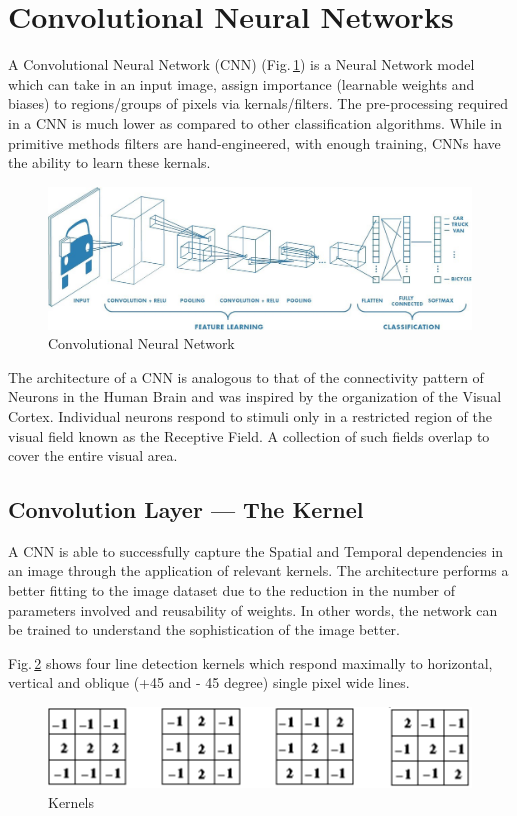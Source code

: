\section{Convolutional Neural Networks}
A Convolutional Neural Network (CNN) (Fig.\,\ref{cnn}) is a Neural Network model which can take in an input image, assign importance (learnable weights and biases) to regions/groups of pixels via kernals/filters. The pre-processing required in a CNN is much lower as compared to other classification algorithms. While in primitive methods filters are hand-engineered, with enough training, CNNs have the ability to learn these kernals.
\begin{figure}[h]
	\centering
	\includegraphics[width=\textwidth]{Figs/cnn.jpg}
    \caption{Convolutional Neural Network}
    \label{cnn}
\end{figure}

The architecture of a CNN is analogous to that of the connectivity pattern of Neurons in the Human Brain and was inspired by the organization of the Visual Cortex. Individual neurons respond to stimuli only in a restricted region of the visual field known as the Receptive Field. A collection of such fields overlap to cover the entire visual area.

\subsection{Convolution Layer — The Kernel}
A CNN is able to successfully capture the Spatial and Temporal dependencies in an image through the application of relevant kernels. The architecture performs a better fitting to the image dataset due to the reduction in the number of parameters involved and reusability of weights. In other words, the network can be trained to understand the sophistication of the image better.

Fig.\,\ref{kernels} shows four line detection kernels which respond maximally to horizontal, vertical and oblique (+45 and - 45 degree) single pixel wide lines.

\begin{figure}[h]
	\centering
	\includegraphics[scale=0.6]{Figs/kernels.png}
    \caption{Kernels}
    \label{kernels}
\end{figure}

